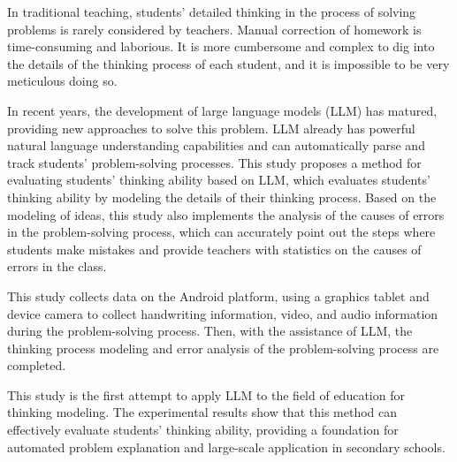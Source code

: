 \begin{abstract*}

  In traditional teaching, students' detailed thinking in the process of solving problems is rarely considered by teachers. Manual correction of homework is time-consuming and laborious. It is more cumbersome and complex to dig into the details of the thinking process of each student, and it is impossible to be very meticulous doing so.

  In recent years, the development of large language models (LLM) has matured, providing new approaches to solve this problem. LLM already has powerful natural language understanding capabilities and can automatically parse and track students' problem-solving processes. This study proposes a method for evaluating students' thinking ability based on LLM, which evaluates students' thinking ability by modeling the details of their thinking process. Based on the modeling of ideas, this study also implements the analysis of the causes of errors in the problem-solving process, which can accurately point out the steps where students make mistakes and provide teachers with statistics on the causes of errors in the class.

  This study collects data on the Android platform, using a graphics tablet and device camera to collect handwriting information, video, and audio information during the problem-solving process. Then, with the assistance of LLM, the thinking process modeling and error analysis of the problem-solving process are completed.

  This study is the first attempt to apply LLM to the field of education for thinking modeling. The experimental results show that this method can effectively evaluate students' thinking ability, providing a foundation for automated problem explanation and large-scale application in secondary schools.

\end{abstract*}
